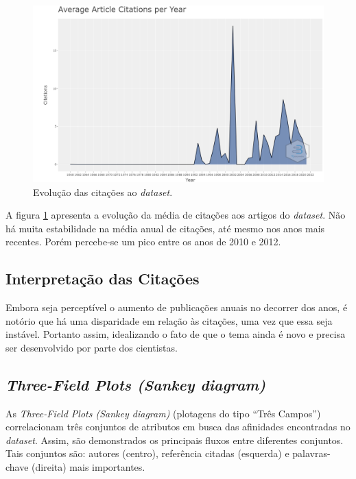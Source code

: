 \begin{figure}
    \centering
    \includegraphics[angle=0,width=1\textwidth]{experiments/titofrota/PesquisaBibliometrica/Deepfakes/citations-year-plot.png}
    \caption{Evolução das citações ao \textit{dataset}.}
    \label{fig:evol:anual:citacoes:DEEPFAKES@titofrota}
\end{figure}

A figura \ref{fig:evol:anual:citacoes:DEEPFAKES@titofrota} apresenta a evolução da média de citações aos artigos do \textit{dataset}. Não há muita estabilidade na média anual de citações, até mesmo nos anos mais recentes. Porém percebe-se um pico entre os anos de 2010 e 2012.

\subsection{Interpretação das Citações}
Embora seja perceptível o aumento de publicações anuais no decorrer dos anos, é notório que há uma disparidade em relação às citações, uma vez que essa seja instável. Portanto assim, idealizando o fato de que o tema ainda é novo e precisa ser desenvolvido por parte dos cientistas.

\subsection{\textit{Three-Field Plots (Sankey diagram)}}

As \textit{Three-Field Plots (Sankey diagram)} (plotagens do tipo ``Três Campos'') correlacionam três conjuntos de atributos em busca das afinidades encontradas no \textit{dataset}. Assim, são demonstrados os principais fluxos entre diferentes conjuntos. Tais conjuntos são: autores (centro), referência citadas (esquerda) e palavras-chave (direita) mais importantes.



